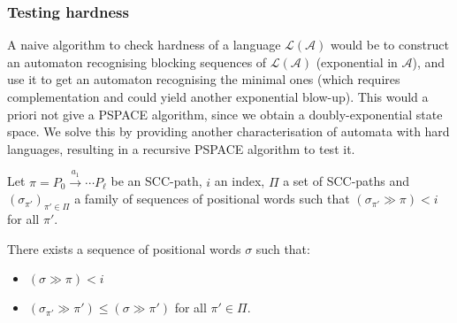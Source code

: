 \documentclass[letterpaper, USenglish, cleveref, autoref, thm-restate, numberwithinsect]{lipics-v2021}
\theoremstyle{theorem}
\theoremstyle{definition}
\newcommand{\Aa}{\mathcal{A}}
\newcommand{\lang}[1]{\mathcal{L}(#1)}
\newcommand{\lefteffect}[2]{(#1 \gg #2)}
\newcommand{\PSPACE}{\textsf{PSPACE}\xspace}
\newcommand{\SCCpath}{\pi}
\begin{document}
\subsubsection{Testing hardness}

A naive algorithm to check hardness of a language $\lang{\Aa}$ would be to construct an automaton recognising blocking sequences of $\lang{\Aa}$ (exponential in $\Aa$), and use it to get an automaton recognising the minimal ones (which requires complementation and could yield another exponential blow-up). This would a priori not give a \PSPACE algorithm, since we obtain a doubly-exponential state space.
We solve this by providing another characterisation of automata with hard languages, resulting in a recursive \PSPACE algorithm to test it.


\begin{lemma}
	\label{lem:uniformisation-blocking-seq}
	Let $\SCCpath = P_0 \xrightarrow{a_1} \cdots  P_\ell$ be an SCC-path, $i$ an index, $\Pi$ a set of SCC-paths and $(\sigma_{\SCCpath'})_{\SCCpath' \in \Pi}$ a family of sequences of positional words such that $\lefteffect{\sigma_{\SCCpath'}}{\SCCpath} < i$ for all $\SCCpath'$.
	
	There exists a sequence of positional words $\sigma$ such that:
	\begin{itemize}
		\item $\lefteffect{\sigma}{\pi} < i$
		\item $\lefteffect{\sigma_{\SCCpath'}}{\SCCpath'} \leq \lefteffect{\sigma}{\SCCpath'}$ for all $\SCCpath' \in \Pi$.
	\end{itemize}
\end{lemma}
\end{document}
